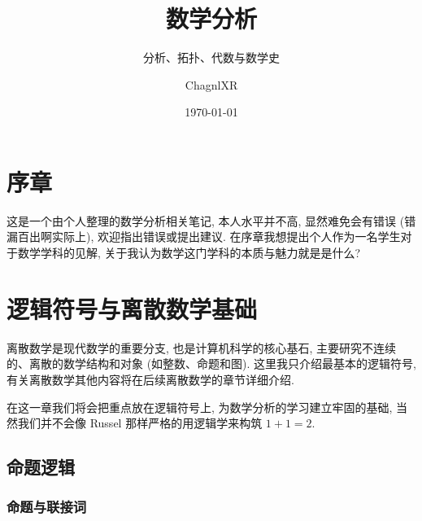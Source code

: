 \documentclass[cn,toc=twocol]{elegantbook}
\title{数学分析}
\subtitle{分析、拓扑、代数与数学史}
\date{\today}
\author{ChagnlXR}
\begin{document}
\maketitle

\setcounter{page}{1}

\tableofcontents


\chapter*{序章}
这是一个由个人整理的数学分析相关笔记, 本人水平并不高, 显然难免会有错误 (错漏百出啊实际上), 欢迎指出错误或提出建议. 在序章我想提出个人作为一名学生对于数学学科的见解, 关于我认为数学这门学科的本质与魅力就是是什么?

\chapter{逻辑符号与离散数学基础}

\setcounter{page}{1}

离散数学是现代数学的重要分支, 也是计算机科学的核心基石, 主要研究不连续的、离散的数学结构和对象 (如整数、命题和图). 这里我只介绍最基本的逻辑符号, 有关离散数学其他内容将在后续离散数学的章节详细介绍.

在这一章我们将会把重点放在逻辑符号上, 为数学分析的学习建立牢固的基础, 当然我们并不会像 Russel 那样严格的用逻辑学来构筑 $1+1=2$.


\section{命题逻辑}

\subsection{命题与联接词}
\end{document}
